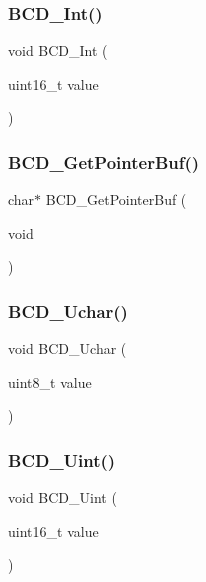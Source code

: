 \mbox{\label{lcd_8c_a19df9ccc086e0e23a07026bb020fec6c}} 
\subsubsection{B\+C\+D\+\_\+Int()}
{\footnotesize\ttfamily void B\+C\+D\+\_\+Int (\begin{DoxyParamCaption}\item[{uint16\+\_\+t}]{value }\end{DoxyParamCaption})}

\mbox{\label{lcd_8c_a60922d87234dfcc4050e1cde674d3c1c}} 
\subsubsection{B\+C\+D\+\_\+\+Get\+Pointer\+Buf()}
{\footnotesize\ttfamily char$\ast$ B\+C\+D\+\_\+\+Get\+Pointer\+Buf (\begin{DoxyParamCaption}\item[{void}]{ }\end{DoxyParamCaption})}

\mbox{\label{lcd_8c_a6f9c47cbcd978ebbb1e443d94ceda26e}} 
\subsubsection{B\+C\+D\+\_\+\+Uchar()}
{\footnotesize\ttfamily void B\+C\+D\+\_\+\+Uchar (\begin{DoxyParamCaption}\item[{uint8\+\_\+t}]{value }\end{DoxyParamCaption})}

\mbox{\label{lcd_8c_a83b2b2a5de3a2efff61432f60b1aaffc}} 
\subsubsection{B\+C\+D\+\_\+\+Uint()}
{\footnotesize\ttfamily void B\+C\+D\+\_\+\+Uint (\begin{DoxyParamCaption}\item[{uint16\+\_\+t}]{value }\end{DoxyParamCaption})}

